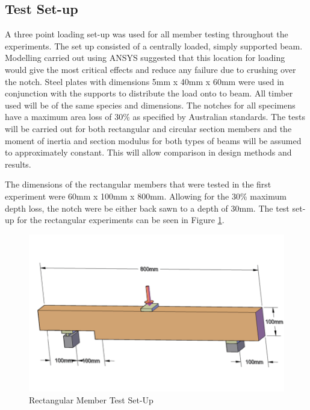 \documentclass[11pt,a4paper]{article}
\numberwithin{equation}{subsection}
\begin{document}
\subsection{Test Set-up}
A three point loading set-up was used for all member testing throughout the experiments. The set up consisted of a centrally loaded, simply supported beam. Modelling carried out using ANSYS suggested that this location for loading would give the most critical effects and reduce any failure due to crushing over the notch. Steel plates with dimensions 5mm x 40mm x 60mm were used in conjunction with the supports to distribute the load onto to beam. All timber used will be of the same species and dimensions. The notches for all specimens have a maximum area loss of 30\% as specified by Australian standards. The tests will be carried out for both rectangular and circular section members and the moment of inertia and section modulus for both types of beams will be assumed to approximately constant. This will allow comparison in design methods and results. 

\vspace*{\baselineskip}

\noindent
The dimensions of the rectangular members that were tested in the first experiment were 60mm x 100mm x 800mm. Allowing for the 30\% maximum depth loss, the notch were be either back sawn to a depth of 30mm. The test set-up for the rectangular experiments can be seen in Figure \ref{fig:rect}.

 \begin{figure}[h]
 	\begin{center}
 		\includegraphics[scale=0.35]{Rectangular_Setup}
 	\end{center}
 	\caption{Rectangular Member Test Set-Up}
 	\label{fig:rect}
 \end{figure}
\end{document}
